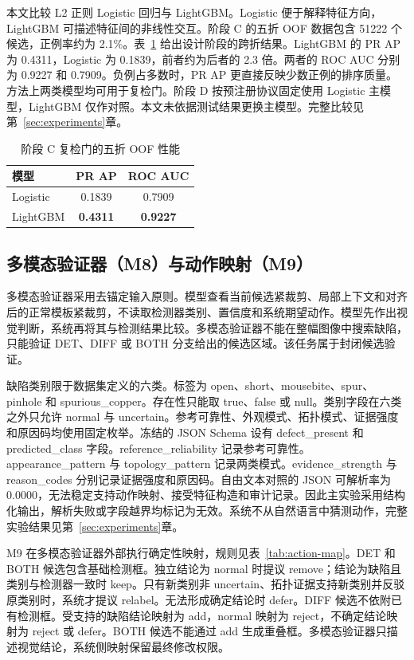 本文比较 L2 正则 Logistic 回归与 LightGBM。Logistic 便于解释特征方向，LightGBM 可描述特征间的非线性交互。阶段 C 的五折 OOF 数据包含 51222 个候选，正例率约为 2.1\%。表~\ref{tab:review-gate-models} 给出设计阶段的跨折结果。LightGBM 的 PR AP 为 0.4311，Logistic 为 0.1839，前者约为后者的 2.3 倍。两者的 ROC AUC 分别为 0.9227 和 0.7909。负例占多数时，PR AP 更直接反映少数正例的排序质量。方法上两类模型均可用于复检门。阶段 D 按预注册协议固定使用 Logistic 主模型，LightGBM 仅作对照。本文未依据测试结果更换主模型。完整比较见第~\ref{sec:experiments}章。

\begin{table}[t]
  \centering
  \caption{阶段 C 复检门的五折 OOF 性能}
  \label{tab:review-gate-models}
  \begin{tabular}{lcc}
    \hline
    模型 & PR AP & ROC AUC \\
    \hline
    Logistic & 0.1839 & 0.7909 \\
    LightGBM & \textbf{0.4311} & \textbf{0.9227} \\
    \hline
  \end{tabular}
\end{table}

\subsection{多模态验证器（M8）与动作映射（M9）}
\label{subsec:mllm-action-map}

多模态验证器采用去锚定输入原则。模型查看当前候选紧裁剪、局部上下文和对齐后的正常模板紧裁剪，不读取检测器类别、置信度和系统期望动作。模型先作出视觉判断，系统再将其与检测结果比较。多模态验证器不能在整幅图像中搜索缺陷，只能验证 DET、DIFF 或 BOTH 分支给出的候选区域。该任务属于封闭候选验证。

缺陷类别限于数据集定义的六类。标签为 open、short、mousebite、spur、pinhole 和 spurious\_copper。存在性只能取 true、false 或 null。类别字段在六类之外只允许 normal 与 uncertain。参考可靠性、外观模式、拓扑模式、证据强度和原因码均使用固定枚举。冻结的 JSON Schema 设有 defect\_present 和 predicted\_class 字段。reference\_reliability 记录参考可靠性。appearance\_pattern 与 topology\_pattern 记录两类模式。evidence\_strength 与 reason\_codes 分别记录证据强度和原因码。自由文本对照的 JSON 可解析率为 0.0000，无法稳定支持动作映射、接受特征构造和审计记录。因此主实验采用结构化输出，解析失败或字段越界均标记为无效。系统不从自然语言中猜测动作，完整实验结果见第~\ref{sec:experiments}章。

M9 在多模态验证器外部执行确定性映射，规则见表~\ref{tab:action-map}。DET 和 BOTH 候选包含基础检测框。独立结论为 normal 时提议 remove；结论为缺陷且类别与检测器一致时 keep。只有新类别非 uncertain、拓扑证据支持新类别并反驳原类别时，系统才提议 relabel。无法形成确定结论时 defer。DIFF 候选不依附已有检测框。受支持的缺陷结论映射为 add，normal 映射为 reject，不确定结论映射为 reject 或 defer。BOTH 候选不能通过 add 生成重叠框。多模态验证器只描述视觉结论，系统侧映射保留最终修改权限。

